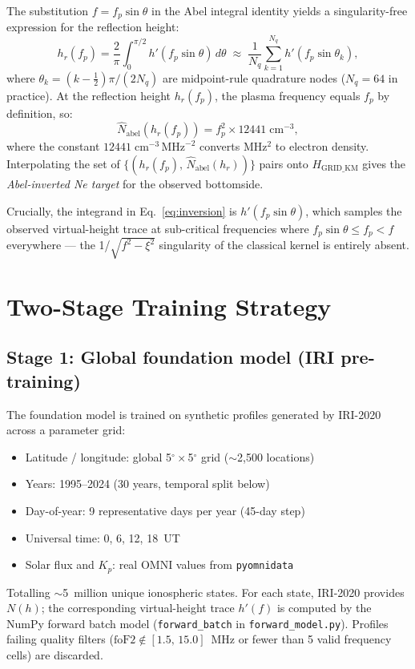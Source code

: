 \documentclass[11pt,twocolumn]{article}
\begin{document}
The substitution $f = f_p \sin\theta$ in the Abel integral identity yields a
singularity-free expression for the reflection height:
\begin{equation}
  h_r(f_p) = \frac{2}{\pi}\int_0^{\pi/2} h'(f_p\sin\theta)\,d\theta
  \;\approx\; \frac{1}{N_q}\sum_{k=1}^{N_q} h'\!\left(f_p\sin\theta_k\right),
  \label{eq:inversion}
\end{equation}
where $\theta_k = (k-\tfrac12)\pi/(2N_q)$ are midpoint-rule quadrature nodes
($N_q = 64$ in practice).
At the reflection height $h_r(f_p)$, the plasma frequency equals $f_p$ by
definition, so:
\begin{equation}
  \hat{N}_\text{abel}(h_r(f_p)) = f_p^2 \times 12441\;\text{cm}^{-3},
  \label{eq:ne_abel}
\end{equation}
where the constant $12441\;\text{cm}^{-3}\,\text{MHz}^{-2}$ converts MHz$^2$ to
electron density.
Interpolating the set of $\{(h_r(f_p),\,\hat{N}_\text{abel}(h_r))\}$ pairs
onto $H_\text{GRID\_KM}$ gives the \emph{Abel-inverted Ne target} for the
observed bottomside.

Crucially, the integrand in Eq.~\eqref{eq:inversion} is $h'(f_p\sin\theta)$, which
samples the observed virtual-height trace at sub-critical frequencies where
$f_p\sin\theta \leq f_p < f$ everywhere --- the 1/$\sqrt{f^2-\xi^2}$
singularity of the classical kernel is entirely absent.

\section{Two-Stage Training Strategy}

\subsection{Stage 1: Global foundation model (IRI pre-training)}

The foundation model is trained on synthetic profiles generated by IRI-2020
\citep{bilitza2022} across a parameter grid:
\begin{itemize}[leftmargin=1.2em, itemsep=1pt, topsep=2pt]
  \item Latitude / longitude: global 5$^\circ\times$5$^\circ$ grid
        ($\sim$2,500 locations)
  \item Years: 1995--2024 (30 years, temporal split below)
  \item Day-of-year: 9 representative days per year (45-day step)
  \item Universal time: 0, 6, 12, 18~UT
  \item Solar flux and $K_p$: real OMNI values from \texttt{pyomnidata}
\end{itemize}
Totalling $\sim$5~million unique ionospheric states.
For each state, IRI-2020 provides $N(h)$; the corresponding virtual-height trace
$h'(f)$ is computed by the NumPy forward batch model (\texttt{forward\_batch} in
\texttt{forward\_model.py}).
Profiles failing quality filters ($\text{foF2} \notin [1.5,\,15.0]$~MHz or fewer
than 5 valid frequency cells) are discarded.
\end{document}
